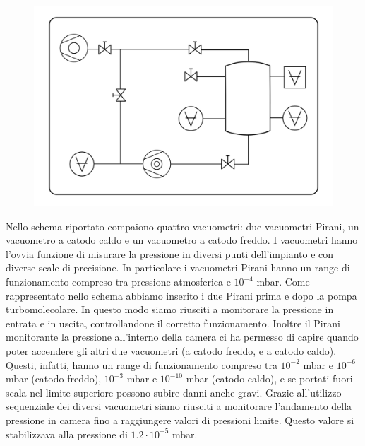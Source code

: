 \documentclass[11pt]{article}
\begin{document}
 \begin{center} 
\begin{figure}[H]
\hspace{-77.5pt}
\includegraphics[scale=0.5]{schema_finale.png}
\caption{}
\label{}
\end{figure}
\end{center}

  \hspace*{5mm}Nello schema riportato compaiono quattro vacuometri: due vacuometri Pirani, un vacuometro a catodo caldo e un vacuometro a catodo freddo. I vacuometri hanno l'ovvia funzione di misurare la pressione in diversi punti dell'impianto e con diverse scale di precisione. In particolare i vacuometri Pirani hanno un range di funzionamento compreso tra pressione atmosferica e $10^{-4}$ mbar. Come rappresentato nello schema abbiamo inserito i due Pirani prima e dopo la pompa turbomolecolare. In questo modo siamo riusciti a monitorare la pressione in entrata e in uscita, controllandone il corretto funzionamento. Inoltre il Pirani monitorante la pressione all'interno della camera ci ha permesso di capire quando poter accendere gli altri due vacuometri (a catodo freddo, e a catodo caldo). Questi, infatti, hanno un range di funzionamento compreso tra $10^{-2}$ mbar e $10^{-6}$ mbar (catodo freddo), $10^{-3}$ mbar e $10^{-10}$ mbar (catodo caldo), e se portati fuori scala nel limite superiore possono subire danni anche gravi. Grazie all'utilizzo sequenziale dei diversi vacuometri siamo riusciti a monitorare l'andamento della pressione in camera fino a raggiungere valori di pressioni limite. Questo valore si stabilizzava alla pressione di $1.2\cdot10^{-5}$ mbar.
\end{document}
